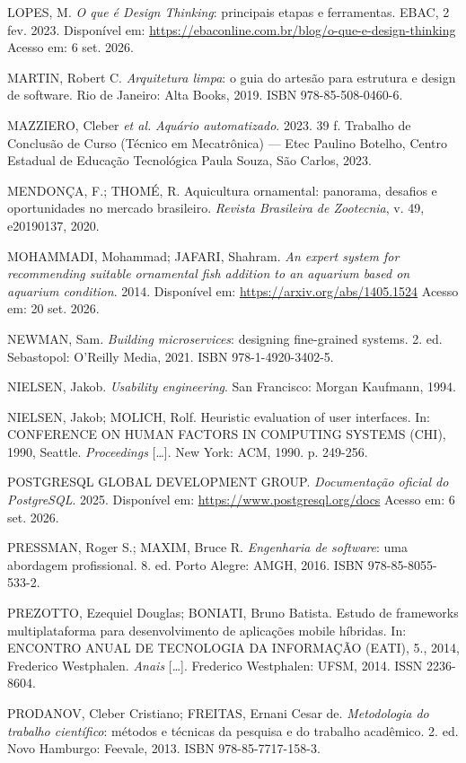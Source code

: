 \documentclass[12pt,oneside,a4paper,brazilian]{abntex2}
\begin{document}
LOPES, M. \textit{O que é Design Thinking}: principais etapas e ferramentas. EBAC, 2 fev. 2023. Disponível em: \url{https://ebaconline.com.br/blog/o-que-e-design-thinking} Acesso em: 6 set. 2026.

MARTIN, Robert C. \textit{Arquitetura limpa}: o guia do artesão para estrutura e design de software. Rio de Janeiro: Alta Books, 2019. ISBN 978-85-508-0460-6.

MAZZIERO, Cleber \textit{et al.} \textit{Aquário automatizado}. 2023. 39 f. Trabalho de Conclusão de Curso (Técnico em Mecatrônica) --- Etec Paulino Botelho, Centro Estadual de Educação Tecnológica Paula Souza, São Carlos, 2023.

MENDONÇA, F.; THOMÉ, R. Aquicultura ornamental: panorama, desafios e oportunidades no mercado brasileiro. \textit{Revista Brasileira de Zootecnia}, v. 49, e20190137, 2020.

MOHAMMADI, Mohammad; JAFARI, Shahram. \textit{An expert system for recommending suitable ornamental fish addition to an aquarium based on aquarium condition}. 2014. Disponível em: \url{https://arxiv.org/abs/1405.1524} Acesso em: 20 set. 2026.

NEWMAN, Sam. \textit{Building microservices}: designing fine-grained systems. 2. ed. Sebastopol: O'Reilly Media, 2021. ISBN 978-1-4920-3402-5.

NIELSEN, Jakob. \textit{Usability engineering}. San Francisco: Morgan Kaufmann, 1994.

NIELSEN, Jakob; MOLICH, Rolf. Heuristic evaluation of user interfaces. In: CONFERENCE ON HUMAN FACTORS IN COMPUTING SYSTEMS (CHI), 1990, Seattle. \textit{Proceedings} [\ldots{}]. New York: ACM, 1990. p. 249-256.

POSTGRESQL GLOBAL DEVELOPMENT GROUP. \textit{Documentação oficial do PostgreSQL}. 2025. Disponível em: \url{https://www.postgresql.org/docs} Acesso em: 6 set. 2026.

PRESSMAN, Roger S.; MAXIM, Bruce R. \textit{Engenharia de software}: uma abordagem profissional. 8. ed. Porto Alegre: AMGH, 2016. ISBN 978-85-8055-533-2.

PREZOTTO, Ezequiel Douglas; BONIATI, Bruno Batista. Estudo de frameworks multiplataforma para desenvolvimento de aplicações mobile híbridas. In: ENCONTRO ANUAL DE TECNOLOGIA DA INFORMAÇÃO (EATI), 5., 2014, Frederico Westphalen. \textit{Anais} [\ldots{}]. Frederico Westphalen: UFSM, 2014. ISSN 2236-8604.

PRODANOV, Cleber Cristiano; FREITAS, Ernani Cesar de. \textit{Metodologia do trabalho científico}: métodos e técnicas da pesquisa e do trabalho acadêmico. 2. ed. Novo Hamburgo: Feevale, 2013. ISBN 978-85-7717-158-3.
\end{document}
